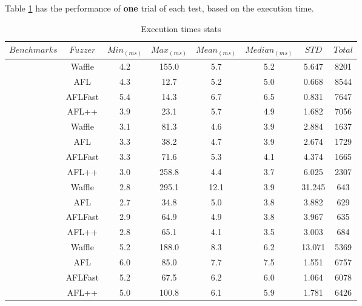 Table \ref{table:all-exe} has the performance of \textbf{one} trial of each test, based on the execution time. 

\begin{table}[!t]
    \begin{adjustbox}{angle=90}
        {\setlength{\extrarowheight}{1ex}%
        \begin{tabular}{|c|c|c|c|c|c|c|c|} 
            \hline
            $Benchmarks$   & $Fuzzer$ & $Min_{(ms)}$ & $Max_{(ms)}$ & $Mean_{(ms)}$ & $Median_{(ms)}$ & $STD$ & $Total$ \\
            \hline
            \rowcolor{lightgray} \cellcolor{white} \multirow[t]{4}{*}{freetype} 
            & Waffle & 4.2 & 155.0 & 5.7 & 5.2 & 5.647 & 8201\\ \cline{2-8}
            & AFL & 4.3 & 12.7 & 5.2 & 5.0 & 0.668 & 8544 \\ \cline{2-8}
            \rowcolor{lightgray} \cellcolor{white} & AFLFast & 5.4 & 14.3 & 6.7 & 6.5 & 0.831 & 7647 \\ \cline{2-8}
            & AFL++ & 3.9 & 23.1 & 5.7 & 4.9 & 1.682 & 7056 \\ \cline{2-8}
            \hline
            \rowcolor{lightgray} \cellcolor{white} \multirow[t]{4}{*}{libjpeg}
            & Waffle   & 3.1 & 81.3 & 4.6 & 3.9 & 2.884 & 1637 \\ \cline{2-8}
            & AFL   & 3.3 & 38.2 & 4.7 & 3.9 & 2.674 & 1729 \\ \cline{2-8}
            \rowcolor{lightgray} \cellcolor{white} & AFLFast   & 3.3 & 71.6 & 5.3 & 4.1 & 4.374 & 1665 \\ \cline{2-8}
            & AFL++   & 3.0 & 258.8 & 4.4 & 3.7 & 6.025 & 2307 \\ \cline{2-8}
            \hline
            \rowcolor{lightgray} \cellcolor{white} \multirow[t]{4}{*}{libpng}
            & Waffle    & 2.8 & 295.1 & 12.1 & 3.9 & 31.245 & 643 \\ \cline{2-8}
            & AFL    & 2.7 & 34.8 & 5.0 & 3.8 & 3.882 & 629 \\ \cline{2-8}
            \rowcolor{lightgray} \cellcolor{white} & AFLFast    & 2.9 & 64.9 & 4.9 & 3.8 & 3.967 & 635 \\ \cline{2-8}
            & AFL++    & 2.8 & 65.1 & 4.1 & 3.5 & 3.003 & 684 \\ \cline{2-8}
            \hline
            \rowcolor{lightgray} \cellcolor{white} \multirow[t]{4}{*}{libxml} 
            & Waffle    & 5.2 & 188.0 & 8.3 & 6.2 & 13.071 & 5369 \\ \cline{2-8}
            & AFL    & 6.0 & 85.0 & 7.7 & 7.5 & 1.551 & 6757 \\ \cline{2-8}
            \rowcolor{lightgray} \cellcolor{white} & AFLFast    & 5.2 & 67.5 & 6.2 & 6.0 & 1.064 & 6078 \\ \cline{2-8}
            & AFL++    & 5.0 & 100.8 & 6.1 & 5.9 & 1.781 & 6426 \\ \cline{2-8}
            \hline
        \end{tabular}
        }
    \end{adjustbox}
    \caption{Execution times stats}
    \label{table:all-exe}
\end{table}
